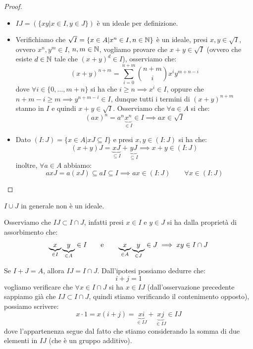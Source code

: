 \documentclass[11pt]{scrartcl}
\begin{document}
\begin{proof}
\begin{itemize}
        \item $IJ = (\{xy | x \in I, y \in J\})$ è un ideale per definizione.
        \item Verifichiamo che $\sqrt{I} = \{x \in A | x^n \in I, n \in \mathbb N\}$ è un ideale, presi $x,y \in \sqrt{I}$, ovvero $x^n,y^m \in I$, $n,m \in \mathbb N$, vogliamo 
            provare che $x + y \in \sqrt{I}$ (ovvero che esiste $d \in \mathbb N$ tale che $(x+y)^d \in I$), osserviamo che:
                \[ (x + y)^{n + m} = \sum_{i = 0}^{n + m} \binom{n+m}{i} x^i y^{m+n-i}
                    \]
            dove $\forall i \in \{0,\ldots,m+n\}$ si ha che $i \geq n \implies x^i \in I$, oppure che $n+m-i \geq m \implies y^{n+m-i} \in I$, dunque tutti i termini di $(x+y)^{n+m}$ stanno in $I$
            e quindi $x + y \in \sqrt{I}$. Osserviamo che $\forall a \in A$ si che:
                \[ (ax)^n = a^n\underbrace{x^n}_{\in I} \in I \implies ax \in \sqrt{I}
                    \]
        \item Dato $(I : J) = \{x \in A | xJ \subseteq I\}$ e presi $x,y \in (I : J)$ si ha che:
            \[ (x+y)J = \underbrace{xJ}_{\subseteq I} + \underbrace{yJ}_{\subseteq I} \implies x+y \in (I:J)
                \]
        inoltre, $\forall a \in A$ abbiamo:
            \[ axJ = a(xJ) \subseteq aI \subseteq I \implies ax \in (I:J) \qquad \forall x \in (I:J)
                \]
    \end{itemize}
\end{proof}

\begin{remark}[$I \cup J$]
    $I \cup J$ in generale non è un ideale.
\end{remark}

\begin{remark}
    Osserviamo che $IJ \subset I \cap J$, infatti presi $x \in I$ e $y \in J$ si ha dalla proprietà di assorbimento che:
        \[ \underbrace{x}_{\in I}\underbrace{y}_{\in A} \in I \qquad \text e \qquad \underbrace{x}_{\in A}\underbrace{y}_{\in J} \in  J \implies xy \in I \cap J
            \]
\end{remark}

\begin{remark}[$IJ = I \cap J$]
    \label{2.24}
    Se $I + J = A$, allora $IJ = I \cap J$. Dall'ipotesi possiamo dedurre che:
        \[ i+j = 1
            \]
    vogliamo verificare che $\forall x \in I \cap J$ si ha $x \in IJ$ (dall'osservazione precedente 
    sappiamo già che $IJ \subset I \cap J$, quindi stiamo verificando il contenimento opposto), possiamo scrivere:
        \[ x \cdot 1 = x(i+j) = \underbrace{xi}_{\in IJ} + \underbrace{xj}_{\in IJ} \in IJ
            \]
    dove l'appartenenza segue dal fatto che stiamo considerando la somma di due elementi in $IJ$ (che è un gruppo additivo).
\end{remark}
\end{document}
